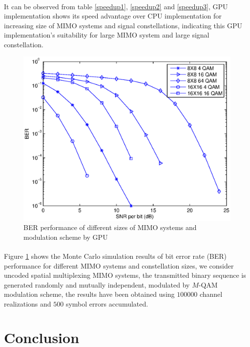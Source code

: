 \documentclass[12pt,a4paper,final]{article}
\begin{document}
\begin{spacing}{2.5}
\paragraph{}It can be observed from table \ref{speedup1}, \ref{speedup2} and \ref{speedup3}, GPU implementation shows its speed advantage over CPU implementation for increasing size of MIMO systems and signal constellations, indicating this GPU implementation's suitability for large MIMO system and large signal constellation.
\begin{figure}[htb]
\centering
\includegraphics[scale=0.65]{BER_curves.eps}
\caption{BER performance of different sizes of MIMO systems and modulation scheme by GPU}
\label{BER curve}
\end{figure}
\paragraph{}Figure \ref{BER curve} shows the Monte Carlo simulation results of bit error rate (BER) performance for different MIMO systems and constellation sizes, we consider uncoded spatial multiplexing MIMO systems, the transmitted binary sequence is generated randomly and  mutually independent, modulated by $M$-QAM modulation scheme, the results have been obtained using $100000$ channel realizations and $500$ symbol errors accumulated. 
\section{Conclusion}\label{conclusion}

\end{spacing}
\end{document}
